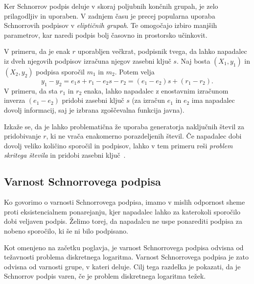 \documentclass[isrm2, tisk]{fmfdelo}
\begin{document}
Ker Schnorrov podpis deluje v skoraj poljubnih končnih grupah, je zelo prilagodljiv in uporaben.
V zadnjem času je precej popularna uporaba Schnorrovih podpisov v \textit{eliptičnih grupah}.
Te omogočajo izbiro manjših parametrov, kar naredi podpis bolj časovno in prostorsko učinkovit.

\begin{opomba}
\label{opomba:nonce}
    V primeru, da je enak $r$ uporabljen večkrat, podpisnik tvega, da lahko napadalec iz dveh njegovih
    podpisov izračuna njegov zasebni ključ $s$. Naj bosta $(X_1, y_1)$ in $(X_2, y_2)$ podpisa sporočil
    $m_1$ in $m_2$. Potem velja
    $$
    y_1 - y_2 = e_1 s + r_1 - e_2 s - r_2 = (e_1 - e_2)s + (r_1 - r_2).
    $$
    V primeru, da sta $r_1$ in $r_2$ enaka, lahko napadalec z enostavnim izračunom inverza $(e_1 - e_2)$
    pridobi zasebni ključ $s$ (za izračun $e_1$ in $e_2$ ima napadalec dovolj informacij, saj je
    izbrana zgoščevalna funkcija javna).

    Izkaže se, da je lahko problematična že uporaba generatorja naključnih števil za pridobivanje
    $r$, ki ne vrača enakomerno porazdeljenih števil. Če napadalec dobi dovolj veliko količino
    sporočil in podpisov, lahko v tem primeru reši \textit{problem skritega števila} in pridobi
    zasebni ključ~\cite{tibouchi2017attacks}.
\end{opomba}

\subsection{Varnost Schnorrovega podpisa}
\label{sec:schnorr-sec}
Ko govorimo o varnosti Schnorrovega podpisa, imamo v mislih odpornost sheme proti eksistencialnem
ponarejanju, kjer napadalec lahko za katerokoli sporočilo dobi veljaven podpis. Želimo torej, da
napadalcu ne uspe ponarediti podpisa za nobeno sporočilo, ki še ni bilo podpisano.

Kot omenjeno na začetku poglavja, je varnost Schnorrovega podpisa odvisna od težavnosti problema
diskretnega logaritma. Varnost Schnorrovega podpisa je zato odvisna od varnosti grupe, v kateri deluje.
Cilj tega razdelka je pokazati, da je Schnorrov podpis varen, če je problem diskretnega logaritma
težek.
\end{document}
